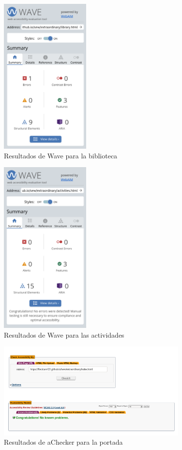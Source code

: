 \documentclass[11pt]{article}
\begin{document}
\begin{figure}[h]
    \centering
    \includegraphics[width=0.4\textwidth]{wave3.png}
    \caption{Resultados de Wave para la biblioteca}
\end{figure}

\begin{figure}[h]
    \centering
    \includegraphics[width=0.4\textwidth]{wave4.png}
    \caption{Resultados de Wave para las actividades}
\end{figure}

\begin{figure}[h]
    \centering
    \includegraphics[width=0.85\textwidth]{achecker1.png}
    \caption{Resultados de aChecker para la portada}
\end{figure}
\end{document}

